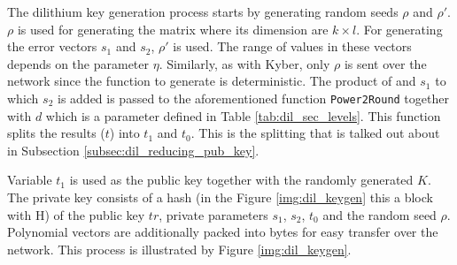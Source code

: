 The dilithium key generation process starts by generating random seeds $\rho$ and $\rho'$. $\rho$ is used for generating the matrix  where its dimension are $k\times l$. For generating the error vectors $s_1$ and $s_2$, $\rho'$ is used. The range of values in these vectors depends on the parameter $\eta$. Similarly, as with Kyber, only $\rho$ is sent over the network since the function to generate  is deterministic. The product of  and $s_1$ to which $s_2$ is added is passed to the aforementioned function \texttt{Power2Round} together with $d$ which is a parameter defined in Table \ref{tab:dil_sec_levels}. This function splits the results ($t$) into $t_1$ and $t_0$. This is the splitting that is talked out about in Subsection \ref{subsec:dil_reducing_pub_key}.

Variable $t_1$ is used as the public key together with the randomly generated $K$. The private key consists of a hash (in the Figure \ref{img:dil_keygen} this a block with H) of the public key $tr$, private parameters $s_1$, $s_2$, $t_0$ and the random seed $\rho$. Polynomial vectors are additionally packed into bytes for easy transfer over the network. This process is illustrated by Figure \ref{img:dil_keygen}.

